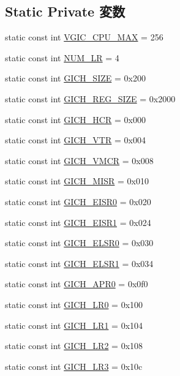 \subsection*{Static Private 変数}
\begin{DoxyCompactItemize}
\item 
static const int \hyperlink{classVGic_abdf6630d700683c52d9cd03f11d660ac}{VGIC\_\-CPU\_\-MAX} = 256
\item 
static const int \hyperlink{classVGic_a4729ce082ccbd9fef9a9131c6b194204}{NUM\_\-LR} = 4
\item 
static const int \hyperlink{classVGic_a85a1239e9b48c54a4342993df2743e13}{GICH\_\-SIZE} = 0x200
\item 
static const int \hyperlink{classVGic_a2ca8a33991e94727efb46a8bba9e1e2a}{GICH\_\-REG\_\-SIZE} = 0x2000
\item 
static const int \hyperlink{classVGic_a05157a03988a41b46b78b6d9d5a49bf6}{GICH\_\-HCR} = 0x000
\item 
static const int \hyperlink{classVGic_ac1961ca86b5c402d101577a495694f42}{GICH\_\-VTR} = 0x004
\item 
static const int \hyperlink{classVGic_a10bf121a0b670d835ede0ba151cb62bd}{GICH\_\-VMCR} = 0x008
\item 
static const int \hyperlink{classVGic_a8f6ba28cb22381782c786778de9236a7}{GICH\_\-MISR} = 0x010
\item 
static const int \hyperlink{classVGic_a6377986cfc790adf7f3274de63f840a5}{GICH\_\-EISR0} = 0x020
\item 
static const int \hyperlink{classVGic_ad2d40266f69c1beee09c888281738df1}{GICH\_\-EISR1} = 0x024
\item 
static const int \hyperlink{classVGic_af16152e073dd9ed6e6ce3515c99301c9}{GICH\_\-ELSR0} = 0x030
\item 
static const int \hyperlink{classVGic_a1dc31e7d69166471775d43e3729228b4}{GICH\_\-ELSR1} = 0x034
\item 
static const int \hyperlink{classVGic_ae799770adf4da02abcc790d891238aec}{GICH\_\-APR0} = 0x0f0
\item 
static const int \hyperlink{classVGic_a75e35ac1eddd88a77229bf915b48273f}{GICH\_\-LR0} = 0x100
\item 
static const int \hyperlink{classVGic_ace36c2959f314bca6c1f53ef7b471011}{GICH\_\-LR1} = 0x104
\item 
static const int \hyperlink{classVGic_a58f68d484460b5ba7753425a306db71e}{GICH\_\-LR2} = 0x108
\item 
static const int \hyperlink{classVGic_a630c33972a6516ce8617656424902292}{GICH\_\-LR3} = 0x10c

\end{DoxyCompactItemize}
